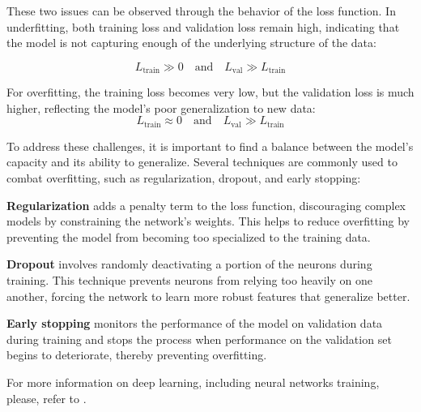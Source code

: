 These two issues can be observed through the behavior of the loss function. In underfitting, both training loss and validation loss remain high, indicating that the model is not capturing enough of the underlying structure of the data: 


\[
  L_{\text{train}} \gg 0 \quad \text{and} \quad L_{\text{val}} \gg L_{\text{train}}
\]


For overfitting, the training loss becomes very low, but the validation loss is much higher, reflecting the model's poor generalization to new data: 
\[
  L_{\text{train}} \approx 0 \quad \text{and} \quad L_{\text{val}} \gg L_{\text{train}}
\]




To address these challenges, it is important to find a balance between the model's capacity and its ability to generalize. Several techniques are commonly used to combat overfitting, such as regularization, dropout, and early stopping:

\textbf{Regularization} adds a penalty term to the loss function, discouraging complex models by constraining the network's weights. This helps to reduce overfitting by preventing the model from becoming too specialized to the training data.
  
\textbf{Dropout} involves randomly deactivating a portion of the neurons during training. This technique prevents neurons from relying too heavily on one another, forcing the network to learn more robust features that generalize better.
  
\textbf{Early stopping} monitors the performance of the model on validation data during training and stops the process when performance on the validation set begins to deteriorate, thereby preventing overfitting.

For more information on deep learning, including neural networks training, please, refer to \cite{goodfellow2016deep}.


